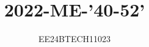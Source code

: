 \documentclass[journal,12pt,onecolumn]{IEEEtran}
\theoremstyle{remark}
\begin{document}

\vspace{3cm}


\title{2022-ME-'40-52'}
\author{EE24BTECH11023}
\maketitle




{\let\newpage\relax\maketitle}

\renewcommand{\thefigure}{\theenumi}
\renewcommand{\thetable}{\theenumi}
\setlength{\intextsep}{10pt} %


\renewcommand{\thetable}{\theenumi}
\end{document}

